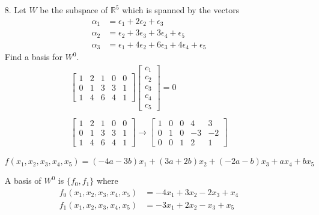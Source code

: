 \documentclass{article}
\begin{document}
\begin{enumerate}[listparindent=\parindent]
\item[8.] Let \(W\) be the subspace of \(\mathbb{R}^5\) which is spanned by the vectors
    \begin{align*}
        \alpha_1 &= \epsilon_1 + 2\epsilon_2 + \epsilon_3 \\
        \alpha_2 &= \epsilon_2 + 3\epsilon_3 + 3\epsilon_4 + \epsilon_5 \\
        \alpha_3 &= \epsilon_1 + 4\epsilon_2 + 6\epsilon_3 + 4\epsilon_4 + \epsilon_5
    \end{align*}
    Find a basis for \(W^0\).
    \begin{gather*}
        \begin{bmatrix}
            1 & 2 & 1 & 0 & 0 \\
            0 & 1 & 3 & 3 & 1 \\
            1 & 4 & 6 & 4 & 1
        \end{bmatrix}
        \begin{bmatrix} c_1 \\ c_2 \\ c_3 \\ c_4 \\ c_5 \end{bmatrix}
        = 0 \\
        \\
        \begin{bmatrix}
            1 & 2 & 1 & 0 & 0 \\
            0 & 1 & 3 & 3 & 1 \\
            1 & 4 & 6 & 4 & 1
        \end{bmatrix}
        \rightarrow
        \begin{bmatrix}
            1 & 0 & 0 & 4 & 3 \\
            0 & 1 & 0 & -3 & -2 \\
            0 & 0 & 1 & 2 & 1
        \end{bmatrix}
    \end{gather*}

    \[ f(x_1, x_2, x_3, x_4, x_5) = (-4a - 3b)x_1 + (3a + 2b)x_2 + (-2a - b)x_3 + ax_4 + bx_5 \]

    A basis of \(W^0\) is \(\{f_0, f_1\}\) where
    \begin{align*}
        f_0(x_1, x_2, x_3, x_4, x_5) &= -4x_1 + 3x_2 - 2x_3 + x_4 \\
        f_1(x_1, x_2, x_3, x_4, x_5) &= -3x_1 + 2x_2 - x_3 + x_5
    \end{align*}



\end{enumerate}
\end{document}

